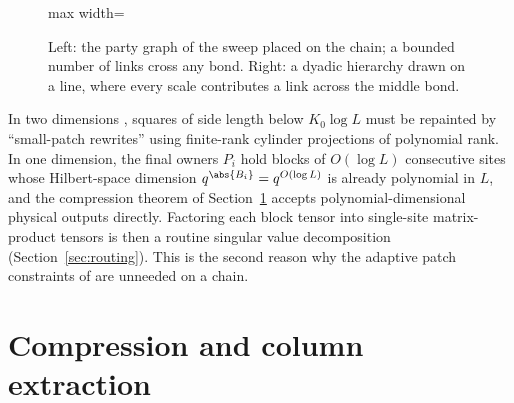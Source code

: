\begin{figure}[t]
\centering
\begin{adjustbox}{max width=\linewidth}

\end{adjustbox}
\caption{Left: the party graph of the sweep placed on the chain; a bounded number of links cross any bond. Right: a dyadic hierarchy drawn on a line, where every scale contributes a link across the middle bond.}\label{fig:party-graph}
\end{figure}

\begin{remark}
In two dimensions \cite[Section~4]{PP}, squares of side length below $K_0\log L$
must be repainted by ``small-patch rewrites'' using finite-rank cylinder
projections of polynomial rank. In one dimension, the final owners $P_i$ hold
blocks of $O(\log L)$ consecutive sites whose Hilbert-space dimension
$q^{\abs{B_i}}=q^{O(\log L)}$ is already polynomial in $L$, and the compression
theorem of Section~\ref{sec:compression} accepts polynomial-dimensional physical
outputs directly. Factoring each block tensor into single-site matrix-product
tensors is then a routine singular value decomposition (Section~\ref{sec:routing}).
This is the second reason why the adaptive patch constraints of \cite{PP} are
unneeded on a chain.
\end{remark}

\section{Compression and column extraction}\label{sec:compression}

